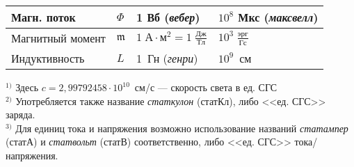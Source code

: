 \begin{labsupplement}
\begin{table}
\begin{tabular}{m{29mm}m{11mm}m{26mm}m{35mm}}
        Магн. поток  & $\Phi$ & 1 Вб (\emph{вебер})
                     & $10^8$ Мкс (\emph{максвелл})                    \bigstrut\\ \hline
        Магнитный момент    & $\mathfrak{m}$ & $1\;А\cdot м^2 = 1\;\frac{Дж}{Тл}$
                        & $10^3\;\frac{эрг}{Гс}$                       \bigstrut\\ \hline
        Индуктивность & $L$ & 1~Гн (\emph{генри})
                      & $10^9$~см                                      \bigstrut\\
\bottomrule[1pt]
    \end{tabular}
    \endgroup
    \vspace*{-0.7\baselineskip}
    \flushleft
    \noindent\footnotesize{}$^{1)}$ Здесь $c = 2,99792458\cdot 10^{10}$~см/с --- скорость света в ед. СГС\\
    $^{2)}$ Употребляется также название \emph{статкулон} (статКл),
    либо <<ед. СГС>> заряда. \\
    $^{3)}$ Для единиц тока и напряжения возможно использование
    названий \emph{статампер} (статА) и \emph{статвольт} (статВ) соответственно,
    либо <<ед. СГС>> тока/напряжения.
\end{table}

\newpage



\end{labsupplement}
